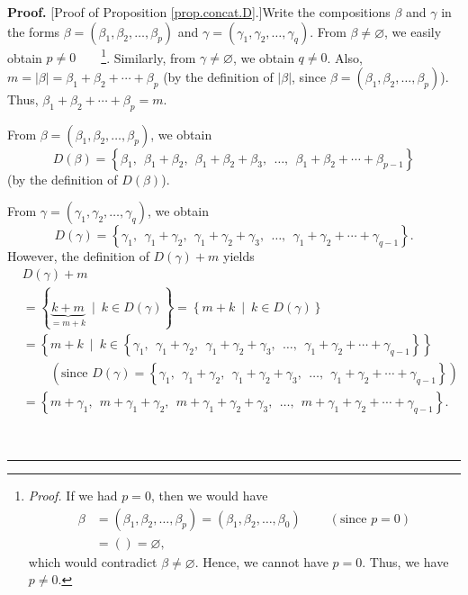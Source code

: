 \documentclass[numbers=enddot,12pt,final,onecolumn,notitlepage]{scrartcl}%
\theoremstyle{definition}
\newenvironment{proof}[1][Proof]{\noindent\textbf{#1.} }{\ \rule{0.5em}{0.5em}}
\begin{document}
\begin{proof}
[Proof of Proposition \ref{prop.concat.D}.]Write the compositions $\beta$ and
$\gamma$ in the forms $\beta=\left(  \beta_{1},\beta_{2},\ldots,\beta
_{p}\right)  $ and $\gamma=\left(  \gamma_{1},\gamma_{2},\ldots,\gamma
_{q}\right)  $. From $\beta\neq\varnothing$, we easily obtain $p\neq
0$\ \ \ \ \footnote{\textit{Proof.} If we had $p=0$, then we would have%
\begin{align*}
\beta &  =\left(  \beta_{1},\beta_{2},\ldots,\beta_{p}\right)  =\left(
\beta_{1},\beta_{2},\ldots,\beta_{0}\right)  \ \ \ \ \ \ \ \ \ \ \left(
\text{since }p=0\right) \\
&  =\left(  {}\right)  =\varnothing,
\end{align*}
which would contradict $\beta\neq\varnothing$. Hence, we cannot have $p=0$.
Thus, we have $p\neq0$.}. Similarly, from $\gamma\neq\varnothing$, we obtain
$q\neq0$. Also, $m=\left\vert \beta\right\vert =\beta_{1}+\beta_{2}%
+\cdots+\beta_{p}$ (by the definition of $\left\vert \beta\right\vert $, since
$\beta=\left(  \beta_{1},\beta_{2},\ldots,\beta_{p}\right)  $). Thus,
$\beta_{1}+\beta_{2}+\cdots+\beta_{p}=m$.

From $\beta=\left(  \beta_{1},\beta_{2},\ldots,\beta_{p}\right)  $, we obtain
\begin{equation}
D\left(  \beta\right)  =\left\{  \beta_{1},\ \ \beta_{1}+\beta_{2}%
,\ \ \beta_{1}+\beta_{2}+\beta_{3},\ \ \ldots,\ \ \beta_{1}+\beta_{2}%
+\cdots+\beta_{p-1}\right\}  \label{pf.prop.concat.D.Db=}%
\end{equation}
(by the definition of $D\left(  \beta\right)  $).

From $\gamma=\left(  \gamma_{1},\gamma_{2},\ldots,\gamma_{q}\right)  $, we
obtain%
\[
D\left(  \gamma\right)  =\left\{  \gamma_{1},\ \ \gamma_{1}+\gamma
_{2},\ \ \gamma_{1}+\gamma_{2}+\gamma_{3},\ \ \ldots,\ \ \gamma_{1}+\gamma
_{2}+\cdots+\gamma_{q-1}\right\}  .
\]
However, the definition of $D\left(  \gamma\right)  +m$ yields%
\begin{align}
&  D\left(  \gamma\right)  +m\nonumber\\
&  =\left\{  \underbrace{k+m}_{=m+k}\ \mid\ k\in D\left(  \gamma\right)
\right\}  =\left\{  m+k\ \mid\ k\in D\left(  \gamma\right)  \right\}
\nonumber\\
&  =\left\{  m+k\ \mid\ k\in\left\{  \gamma_{1},\ \ \gamma_{1}+\gamma
_{2},\ \ \gamma_{1}+\gamma_{2}+\gamma_{3},\ \ \ldots,\ \ \gamma_{1}+\gamma
_{2}+\cdots+\gamma_{q-1}\right\}  \right\} \nonumber\\
&  \ \ \ \ \ \ \ \ \ \ \left(  \text{since }D\left(  \gamma\right)  =\left\{
\gamma_{1},\ \ \gamma_{1}+\gamma_{2},\ \ \gamma_{1}+\gamma_{2}+\gamma
_{3},\ \ \ldots,\ \ \gamma_{1}+\gamma_{2}+\cdots+\gamma_{q-1}\right\}  \right)
\nonumber\\
&  =\left\{  m+\gamma_{1},\ \ m+\gamma_{1}+\gamma_{2},\ \ m+\gamma_{1}%
+\gamma_{2}+\gamma_{3},\ \ \ldots,\ \ m+\gamma_{1}+\gamma_{2}+\cdots
+\gamma_{q-1}\right\}  . \label{pf.prop.concat.D.Dgm=}%
\end{align}



\end{proof}
\end{document}
